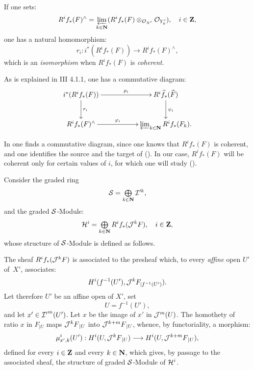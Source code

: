 If one sets:
\begin{equation} \label{eq:IX.1.5} R^i f_*(F)^{\wedge}=\varprojlim_{k \in \mathbf{N}} (R^i f_*(F) \otimes_{{{\mathcal O}}_{X'}}{{\mathcal O}}_{Y'_k}), \quad i \in \mathbf{Z},
\end{equation}
one has a natural homomorphism:
\begin{equation} \label{eq:IX.1.6} r_i: i^*(R^if_*(F)) \to R^i f_*(F)^{\wedge},
\end{equation}
which is an \emph{isomorphism} when $ R^i f_*(F)$ is \emph{coherent}.

As is explained in \EGA III 4.1.1, one has a commutative diagram:
\begin{equation} \label{eq:IX.1.7}
\begin{array}{c}
\xymatrix{ i^*(R^i f_*(F)) \ar[rr]^-{\rho_i} \ar[d]^{r_i} & &R^i\hat{f}_*(\hat{F}) \ar[d]^{\psi_i} \\
R^i f_*(F)^{\wedge}\ar[rr]^-{\varphi_i} & &\varprojlim_{k \in \NN} R^i f_*(F_k).
}
\end{array}
\end{equation}

In \loccit one finds a commutative diagram, since one knows that $ R^if_*(F)$ is coherent, and one identifies the source and the target of (). In our case, $ R^if_*(F)$ will be coherent only for certain values of $i$, for which one will study ().

Consider the graded ring
\begin{equation} \label{eq:IX.1.8}
{\mathcal S} = \mathop{\textstyle\bigoplus}\limits_{k \in \mathbf{N}} {\mathcal I}'^k,
\end{equation}
and the graded ${\mathcal S}$-Module:
\begin{equation} \label{eq:IX.1.9}
{\mathcal H}^i= \mathop{\textstyle\bigoplus}\limits_{k \in \mathbf{N}} R^if_*({\mathcal{J}}^k F), \quad i \in \mathbf{Z},
\end{equation}
whose structure of ${\mathcal S}$-Module is defined as follows.

The sheaf $R^if_*({\mathcal{J}}^k F)$ is associated to the presheaf which, to every \emph{affine} open $U'$ of~$X'$, associates:
\begin{equation} \label{eq:IX.1.10} H^i(f^{-1}(U'), {\mathcal{J}}^k F_{|f^{-1}(U')}).
\end{equation}
 Let therefore $U'$ be an affine open of $X'$, set
\begin{equation*} U=f^{-1}(U'),
\end{equation*}
and let $x'\in {{\mathcal I}'}^m(U')$. Let $x$ be the image of $x'$ in ${\mathcal{J}}^{{m}} (U)$. The homothety of ratio $x$ in $F_{|U}$ maps ${\mathcal{J}}^kF{_{|U}}$ into ${\mathcal{J}}^{k+m}F{_{|U}}$, whence, by functoriality, a morphism:
\begin{equation} \label{eq:IX.1.11} \mu^i_{x', k}(U'):H^i(U, {\Jb}^kF{_{|U}})\to H^i(U, {\Jb}^{k+m}F{_{|U}}),
\end{equation}
defined for every $i \in \mathbf{Z}$ and every $k \in \mathbf{N}$, which gives, by passage to the associated sheaf, the structure of graded ${\mathcal S}$-Module of ${\mathcal H}^i$.

